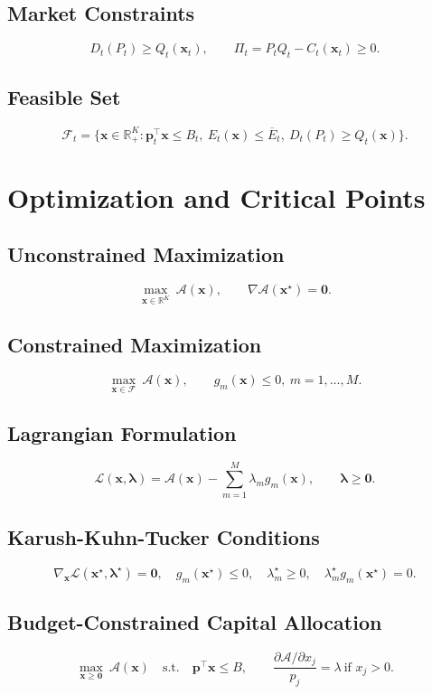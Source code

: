 \documentclass[11pt]{article}
\begin{document}
\subsection{Market Constraints}
\[
D_t(P_t)\ge Q_t(\bm{x}_t),
\qquad \Pi_t=P_tQ_t-C_t(\bm{x}_t)\ge 0.
\]

\subsection{Feasible Set}
\[
\mathcal{F}_t=\{\bm{x}\in\mathbb{R}^K_+: \bm{p}_t^\top\bm{x}\le B_t,\ E_t(\bm{x})\le\overline{E}_t,\ D_t(P_t)\ge Q_t(\bm{x})\}.
\]

\section{Optimization and Critical Points}

\subsection{Unconstrained Maximization}
\[
\max_{\bm{x}\in\mathbb{R}^K} \ \mathcal{A}(\bm{x}),
\qquad \nabla\mathcal{A}(\bm{x}^{\star})=\bm{0}.
\]

\subsection{Constrained Maximization}
\[
\max_{\bm{x}\in\mathcal{F}}\ \mathcal{A}(\bm{x}),
\qquad g_m(\bm{x})\le 0,\ m=1,\dots,M.
\]

\subsection{Lagrangian Formulation}
\[
\mathcal{L}(\bm{x},\bm{\lambda})=\mathcal{A}(\bm{x})-\sum_{m=1}^M\lambda_m g_m(\bm{x}),
\qquad \bm{\lambda}\ge\bm{0}.
\]

\subsection{Karush-Kuhn-Tucker Conditions}
\[
\nabla_{\bm{x}}\mathcal{L}(\bm{x}^{\star},\bm{\lambda}^{\star})=\bm{0},
\quad g_m(\bm{x}^{\star})\le 0,
\quad \lambda_m^{\star}\ge 0,
\quad \lambda_m^{\star}g_m(\bm{x}^{\star})=0.
\]

\subsection{Budget-Constrained Capital Allocation}
\[
\max_{\bm{x}\ge\bm{0}}\ \mathcal{A}(\bm{x})
\quad\text{s.t.}\quad \bm{p}^\top\bm{x}\le B,
\qquad \frac{\partial\mathcal{A}/\partial x_j}{p_j}=\lambda\ \text{if }x_j>0.
\]
\end{document}
